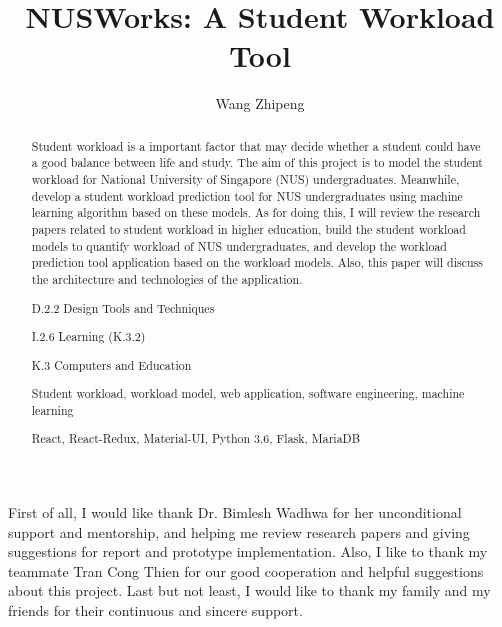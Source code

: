 \documentclass[fyp]{socreport}
\begin{document}
\title{NUSWorks: A Student Workload Tool}
\author{Wang Zhipeng}
\maketitle
\begin{abstract}
Student workload is a important factor that may decide whether a student could have a good balance between life and study. The aim of this project is to model the student workload for National University of Singapore (NUS) undergraduates. Meanwhile, develop a student workload prediction tool for NUS undergraduates using machine learning algorithm based on these models. As for doing this, I will review the research papers related to student workload in higher education, build the student workload models to quantify workload of NUS undergraduates, and develop the workload prediction tool application based on the workload models. Also, this paper will discuss the architecture and technologies of the application.

\begin{descriptors}
	\item D.2.2 Design Tools and Techniques
  \item I.2.6 Learning (K.3.2)
	\item K.3 Computers and Education
\end{descriptors}
\begin{keywords}
	Student workload, workload model, web application, software engineering, machine learning
\end{keywords}
\begin{implement}
	React, React-Redux, Material-UI, Python 3.6, Flask, MariaDB
\end{implement}
\end{abstract}

\begin{acknowledgement}
First of all, I would like thank Dr. Bimlesh Wadhwa for her unconditional support and mentorship, and helping me review research papers and giving suggestions for report and prototype implementation. Also, I like to thank my teammate Tran Cong Thien for our good cooperation and helpful suggestions about this project. Last but not least, I would like to thank my family and my friends for their continuous and sincere support.
\end{acknowledgement}
\end{document}
